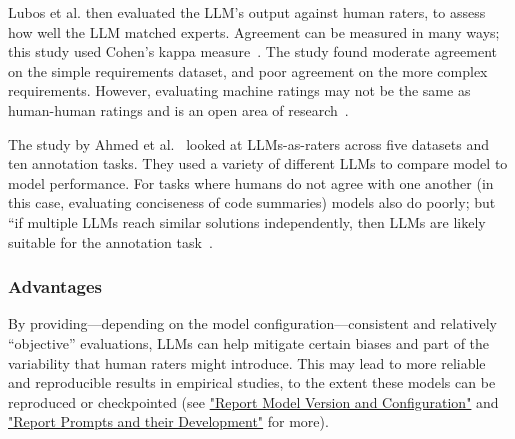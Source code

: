 Lubos et al. then evaluated the LLM's output against human raters, to assess how well the LLM matched experts. 
Agreement can be measured in many ways; this study used Cohen's kappa measure~\cite{cohen60}. The study found moderate agreement on the simple requirements dataset, and poor agreement on the more complex requirements. However, evaluating machine ratings may not be the same as human-human ratings and is an open area of research~\cite{DBLP:journals/corr/abs-2410-03775}. 

The study by Ahmed et al.~\cite{DBLP:journals/corr/abs-2408-05534} looked at LLMs-as-raters across five datasets and ten annotation tasks. They used a variety of different LLMs to compare model to model performance. For tasks where humans do not agree with one another (in this case, evaluating conciseness of code summaries) models also do poorly; but ``if multiple LLMs reach similar solutions independently, then LLMs are likely suitable for the annotation task~\cite[p.6]{DBLP:journals/corr/abs-2408-05534}.



\subsubsection{Advantages}

By providing---depending on the model configuration---consistent and relatively ``objective'' evaluations, LLMs can help mitigate certain biases and part of the variability that human raters might introduce. 
This may lead to more reliable and reproducible results in empirical studies, to the extent these models can be reproduced or checkpointed (see \href{/guidelines/#report-model-version-and-configuration}{"Report Model Version and Configuration"} and \href{/guidelines/#report-prompts-and-their-development}{"Report Prompts and their Development"} for more).

